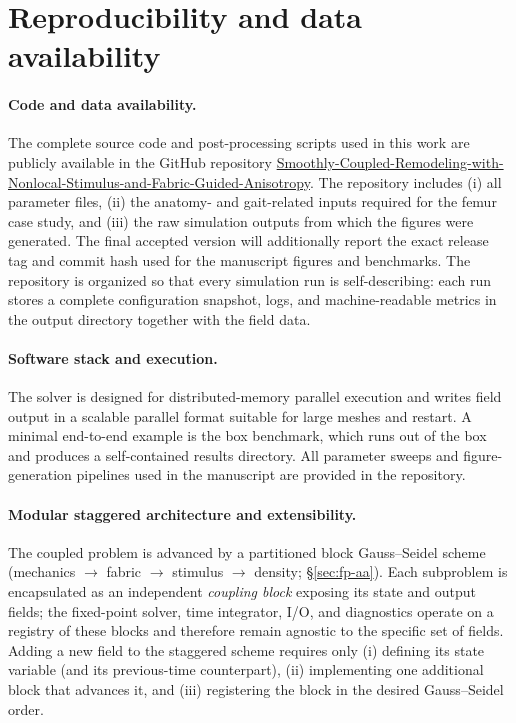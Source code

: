 \section*{Reproducibility and data availability}
\label{sec:reproducibility}

\paragraph{Code and data availability.}
The complete source code and post-processing scripts used in this work are publicly available in the GitHub repository \href{https://github.com/petr-henys/Smoothly-Coupled-Remodeling-with-Nonlocal-Stimulus-and-Fabric-Guided-Anisotropy}{Smoothly-Coupled-Remodeling-with-Nonlocal-Stimulus-and-Fabric-Guided-Anisotropy}.
The repository includes (i) all parameter files, (ii) the anatomy- and gait-related inputs required for the femur case study, and (iii) the raw simulation outputs from which the figures were generated.
The final accepted version will additionally report the exact release tag and commit hash used for the manuscript figures and benchmarks.
The repository is organized so that every simulation run is self-describing: each run stores a complete configuration snapshot, logs, and machine-readable metrics in the output directory together with the field data.

\paragraph{Software stack and execution.}
The solver is designed for distributed-memory parallel execution and writes field output in a scalable parallel format suitable for large meshes and restart.
A minimal end-to-end example is the box benchmark, which runs out of the box and produces a self-contained results directory.
All parameter sweeps and figure-generation pipelines used in the manuscript are provided in the repository.

\paragraph{Modular staggered architecture and extensibility.}
The coupled problem is advanced by a partitioned block Gauss--Seidel scheme (mechanics $\rightarrow$ fabric $\rightarrow$ stimulus $\rightarrow$ density; \S\ref{sec:fp-aa}).
Each subproblem is encapsulated as an independent \emph{coupling block} exposing its state and output fields; the fixed-point solver, time integrator, I/O, and diagnostics operate on a registry of these blocks and therefore remain agnostic to the specific set of fields.
Adding a new field to the staggered scheme requires only (i) defining its state variable (and its previous-time counterpart), (ii) implementing one additional block that advances it, and (iii) registering the block in the desired Gauss--Seidel order.

